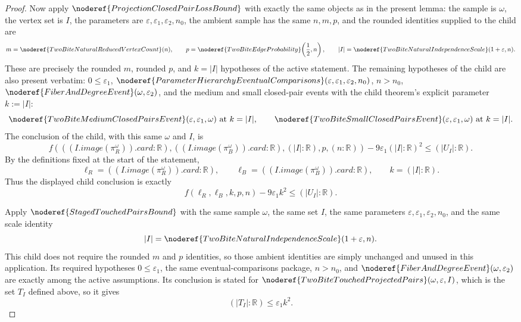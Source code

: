 \begin{proof}
Now apply \(\noderef{ProjectionClosedPairLossBound}\) with exactly the same
objects as in the present lemma: the sample is \(\omega\), the vertex set is
\(I\), the parameters are \(\varepsilon,\varepsilon_1,\varepsilon_2,n_0\), the
ambient sample has the same \(n,m,p\), and the rounded identities supplied to
the child are
\[
m=\noderef{TwoBiteNaturalReducedVertexCount}(n),\qquad
p=\noderef{TwoBiteEdgeProbability}\!\left(\frac12,n\right),\qquad
|I|=\noderef{TwoBiteNaturalIndependenceScale}(1+\varepsilon,n).
\]
These are precisely the rounded \(m\), rounded \(p\), and
\(k=|I|\) hypotheses of the active statement.  The remaining hypotheses of the
child are also present verbatim: \(0\le\varepsilon_1\),
\(\noderef{ParameterHierarchyEventualComparisons}
(\varepsilon,\varepsilon_1,\varepsilon_2,n_0)\), \(n>n_0\),
\(\noderef{FiberAndDegreeEvent}(\omega,\varepsilon_2)\), and the medium and
small closed-pair events with the child theorem's explicit parameter
\(k:=|I|\):
\[
\noderef{TwoBiteMediumClosedPairsEvent}(\varepsilon,\varepsilon_1,\omega)
\text{ at } k=|I|,
\qquad
\noderef{TwoBiteSmallClosedPairsEvent}(\varepsilon,\varepsilon_1,\omega)
\text{ at } k=|I|.
\]
The conclusion of the child, with this same \(\omega\) and \(I\), is
\[
f\!\left(((I.image(\pi_R^\omega)).card:\mathbb R),
((I.image(\pi_B^\omega)).card:\mathbb R),
(|I|:\mathbb R),p,(n:\mathbb R)\right)
-9\varepsilon_1(|I|:\mathbb R)^2
\le (|U_I|:\mathbb R).
\]
By the definitions fixed at the start of the statement,
\[
\ell_R=((I.image(\pi_R^\omega)).card:\mathbb R),\qquad
\ell_B=((I.image(\pi_B^\omega)).card:\mathbb R),\qquad
k=(|I|:\mathbb R).
\]
Thus the displayed child conclusion is exactly
\[
f(\ell_R,\ell_B,k,p,n)-9\varepsilon_1k^2\le (|U_I|:\mathbb R).
\tag{D}
\]

Apply \(\noderef{StagedTouchedPairsBound}\) with the same sample \(\omega\),
the same set \(I\), the same parameters
\(\varepsilon,\varepsilon_1,\varepsilon_2,n_0\), and the same scale identity
\[
|I|=\noderef{TwoBiteNaturalIndependenceScale}(1+\varepsilon,n).
\]
This child does not require the rounded \(m\) and \(p\) identities, so those
ambient identities are simply unchanged and unused in this application.  Its
required hypotheses \(0\le\varepsilon_1\), the same eventual-comparisons
package, \(n>n_0\), and
\(\noderef{FiberAndDegreeEvent}(\omega,\varepsilon_2)\) are exactly among the
active assumptions.  Its conclusion is stated for
\(\noderef{TwoBiteTouchedProjectedPairs}(\omega,\varepsilon,I)\), which is
the set \(T_I\) defined above, so it gives
\[
(|T_I|:\mathbb R)\le \varepsilon_1k^2.
\tag{E}
\]


\end{proof}
